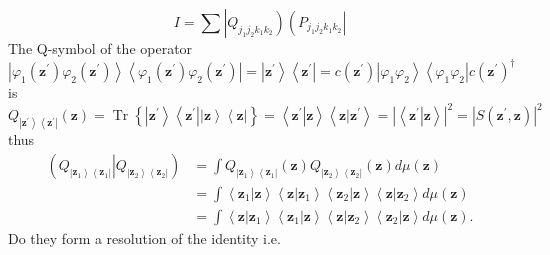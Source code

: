 \documentclass[aps,preprint]{revtex4}%
\begin{document}
\begin{equation}
I=\sum\left\vert Q_{j_{1}j_{2}k_{1}k_{2}}\right)  \left(  P_{j_{1}j_{2}%
k_{1}k_{2}}\right\vert
\end{equation}
The Q-symbol of the operator
\begin{equation}
\left\vert \varphi_{1}\left(  \mathbf{z}^{\prime}\right)  \varphi_{2}\left(
\mathbf{z}^{\prime}\right)  \right\rangle \left\langle \varphi_{1}\left(
\mathbf{z}^{\prime}\right)  \varphi_{2}\left(  \mathbf{z}^{\prime}\right)
\right\vert =\left\vert \mathbf{z}^{\prime}\right\rangle \left\langle
\mathbf{z}^{\prime}\right\vert =c\left(  \mathbf{z}^{\prime}\right)
\left\vert \varphi_{1}\varphi_{2}\right\rangle \left\langle \varphi_{1}%
\varphi_{2}\right\vert c\left(  \mathbf{z}^{\prime}\right)  ^{\dagger}%
\end{equation}
is
\begin{equation}
Q_{\left\vert \mathbf{z}^{\prime}\right\rangle \left\langle \mathbf{z}%
^{\prime}\right\vert }\left(  \mathbf{z}\right)  =\operatorname*{Tr}\left\{
\left\vert \mathbf{z}^{\prime}\right\rangle \left\langle \mathbf{z}^{\prime
}\right\vert \left\vert \mathbf{z}\right\rangle \left\langle \mathbf{z}%
\right\vert \right\}  =\left\langle \left.  \mathbf{z}^{\prime}\right\vert
\mathbf{z}\right\rangle \left\langle \left.  \mathbf{z}\right\vert
\mathbf{z}^{\prime}\right\rangle =\left\vert \left\langle \left.
\mathbf{z}^{\prime}\right\vert \mathbf{z}\right\rangle \right\vert
^{2}=\left\vert S\left(  \mathbf{z}^{\prime},\mathbf{z}\right)  \right\vert
^{2}%
\end{equation}
thus
\begin{align}
\left(  Q_{\left\vert \mathbf{z}_{1}\right\rangle \left\langle \mathbf{z}%
_{1}\right\vert }\left\vert Q_{\left\vert \mathbf{z}_{2}\right\rangle
\left\langle \mathbf{z}_{2}\right\vert }\right.  \right)   &  =\int
Q_{\left\vert \mathbf{z}_{1}\right\rangle \left\langle \mathbf{z}%
_{1}\right\vert }\left(  \mathbf{z}\right)  Q_{\left\vert \mathbf{z}%
_{2}\right\rangle \left\langle \mathbf{z}_{2}\right\vert }\left(
\mathbf{z}\right)  d\mu\left(  \mathbf{z}\right) \\
&  =\int\left\langle \left.  \mathbf{z}_{1}\right\vert \mathbf{z}\right\rangle
\left\langle \left.  \mathbf{z}\right\vert \mathbf{z}_{1}\right\rangle
\left\langle \left.  \mathbf{z}_{2}\right\vert \mathbf{z}\right\rangle
\left\langle \left.  \mathbf{z}\right\vert \mathbf{z}_{2}\right\rangle
d\mu\left(  \mathbf{z}\right) \\
&  =\int\left\langle \left.  \mathbf{z}\right\vert \mathbf{z}_{1}\right\rangle
\left\langle \left.  \mathbf{z}_{1}\right\vert \mathbf{z}\right\rangle
\left\langle \left.  \mathbf{z}\right\vert \mathbf{z}_{2}\right\rangle
\left\langle \left.  \mathbf{z}_{2}\right\vert \mathbf{z}\right\rangle
d\mu\left(  \mathbf{z}\right)  .
\end{align}
Do they form a resolution of the identity i.e.%
\end{document}
